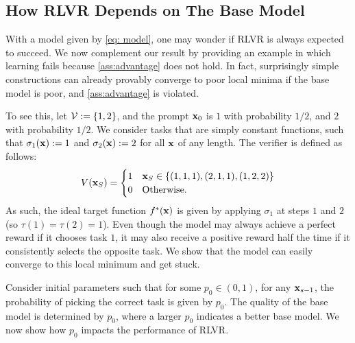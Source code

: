 \documentclass{article}
\theoremstyle{plain}
\theoremstyle{definition}
\theoremstyle{remark}
\begin{document}
\subsection{How RLVR Depends on The Base Model}\label{sec: neg}

With a model given by \eqref{eq: model}, one may wonder if RLVR is always expected to succeed. We now complement our result by providing an example in which learning fails because \cref{ass:advantage} does not hold. In fact, surprisingly simple constructions can already provably converge to poor local minima if the base model is poor, and \cref{ass:advantage} is violated. 

To see this, let $\mathcal{V} := \{1, 2 \}$, and the prompt $\mathbf{x}_0$ is $1$ with probability $1/2$, and $2$ with probability $1/2$. We consider tasks that are simply constant functions, such that $\sigma_1(\mathbf{x}) := 1$ and $\sigma_2(\mathbf{x}) := 2$ for all $\mathbf{x}$ of any length. The verifier is defined as follows:
\begin{align*}
    V(\mathbf{x}_S) = 
    \begin{cases}
        1 & \mathbf{x}_S \in \{(1, 1, 1), (2, 1, 1), (1, 2, 2)\} \\ 
        0 & \text{Otherwise}.
    \end{cases}
\end{align*}
As such, the ideal target function $f^*(\mathbf{x})$ is given by applying $\sigma_1$ at steps $1$ and $2$ (so $\tau(1) = \tau(2)=1$). 
Even though the model may always achieve a perfect reward if it chooses task $1$, it may also receive a positive reward half the time if it consistently selects the opposite task. We show that the model can easily converge to this local minimum and get stuck.

Consider initial parameters such that for some $p_0\in(0,1)$, for any $\mathbf{x}_{s-1}$, the probability of picking the correct task is given by $p_0$. The quality of the base model is determined by $p_0$, where a larger $p_0$ indicates a better base model. We now show how $p_0$ impacts the performance of RLVR.
\end{document}
